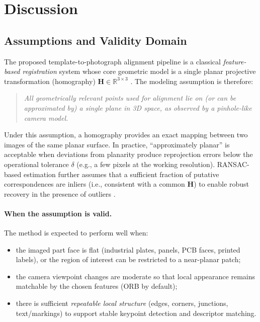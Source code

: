 
\section{Discussion}
\label{sec:discussion}

\subsection{Assumptions and Validity Domain}
\label{subsec:assumptions_validity}
The proposed template-to-photograph alignment pipeline is a classical \emph{feature-based registration} system whose core geometric model is a single planar projective transformation (homography) $\mathbf{H}\in\mathbb{R}^{3\times 3}$ \citep{HartleyZisserman2004}. The modeling assumption is therefore:

\begin{quote}
\emph{All geometrically relevant points used for alignment lie on (or can be approximated by) a single plane in 3D space, as observed by a pinhole-like camera model.}
\end{quote}

Under this assumption, a homography provides an exact mapping between two images of the same planar surface. In practice, ``approximately planar'' is acceptable when deviations from planarity produce reprojection errors below the operational tolerance $\delta$ (e.g., a few pixels at the working resolution). RANSAC-based estimation further assumes that a sufficient fraction of putative correspondences are inliers (i.e., consistent with a common $\mathbf{H}$) to enable robust recovery in the presence of outliers \citep{FischlerBolles1981}.

\paragraph{When the assumption is valid.}
The method is expected to perform well when:
\begin{itemize}
  \item the imaged part face is flat (industrial plates, panels, PCB faces, printed labels), or the region of interest can be restricted to a near-planar patch;
  \item the camera viewpoint changes are moderate so that local appearance remains matchable by the chosen features (ORB by default);
  \item there is sufficient \emph{repeatable local structure} (edges, corners, junctions, text/markings) to support stable keypoint detection and descriptor matching.
\end{itemize}

